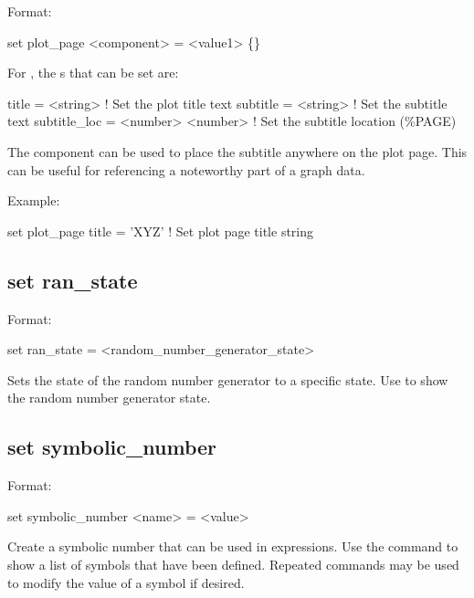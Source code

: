 {{{{{Format:
\begin{example}
  set plot_page <component> = <value1> \{<value2>\}
\end{example}

For , the s that can be set are:
\begin{example}
  title        = <string>          ! Set the plot title text
  subtitle     = <string>          ! Set the subtitle text
  subtitle_loc = <number> <number> ! Set the subtitle location (\%PAGE)
\end{example}
The  component can be used to place the subtitle anywhere on the plot
page. This can be useful for referencing a noteworthy part of a graph data.

Example:
\begin{example}
  set plot_page title = 'XYZ'  ! Set plot page title string
\end{example}


\subsection{set ran\_state}
\label{s:set.ran.state}

Format:
\begin{example}
  set ran_state = <random_number_generator_state>
\end{example}

Sets the state of the random number generator to a specific state. Use  to show the random number generator state.


\subsection{set symbolic_number}
\label{s:set.symbolic}

Format:
\begin{example}
  set symbolic_number <name> = <value>
\end{example}

Create a symbolic number that can be used in expressions. Use the  command
to show a list of symbols that have been defined. Repeated  commands may be used to modify
the value of a symbol if desired.

}}}}}
